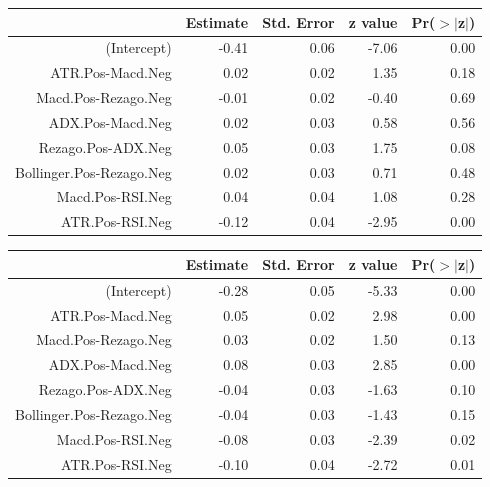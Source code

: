 \documentclass[a4paper,12pt]{Latex/Classes/PhDthesisPSnPDF}
\begin{document}
\begin{center}
\begin{table}[ht]
\centering
\begin{tabular}{rrrrr}
  \hline
 & Estimate & Std. Error & z value & Pr($>$$|$z$|$) \\ 
  \hline
(Intercept) & -0.41 & 0.06 & -7.06 & 0.00 \\ 
  ATR.Pos-Macd.Neg & 0.02 & 0.02 & 1.35 & 0.18 \\ 
  Macd.Pos-Rezago.Neg & -0.01 & 0.02 & -0.40 & 0.69 \\ 
  ADX.Pos-Macd.Neg & 0.02 & 0.03 & 0.58 & 0.56 \\ 
  Rezago.Pos-ADX.Neg & 0.05 & 0.03 & 1.75 & 0.08 \\ 
  Bollinger.Pos-Rezago.Neg & 0.02 & 0.03 & 0.71 & 0.48 \\ 
  Macd.Pos-RSI.Neg & 0.04 & 0.04 & 1.08 & 0.28 \\ 
  ATR.Pos-RSI.Neg & -0.12 & 0.04 & -2.95 & 0.00 \\ 
   \hline
\end{tabular}
\end{table}\end{center}

\newpage
\begin{center}
\begin{table}[ht]
\centering
\begin{tabular}{rrrrr}
  \hline
 & Estimate & Std. Error & z value & Pr($>$$|$z$|$) \\ 
  \hline
(Intercept) & -0.28 & 0.05 & -5.33 & 0.00 \\ 
  ATR.Pos-Macd.Neg & 0.05 & 0.02 & 2.98 & 0.00 \\ 
  Macd.Pos-Rezago.Neg & 0.03 & 0.02 & 1.50 & 0.13 \\ 
  ADX.Pos-Macd.Neg & 0.08 & 0.03 & 2.85 & 0.00 \\ 
  Rezago.Pos-ADX.Neg & -0.04 & 0.03 & -1.63 & 0.10 \\ 
  Bollinger.Pos-Rezago.Neg & -0.04 & 0.03 & -1.43 & 0.15 \\ 
  Macd.Pos-RSI.Neg & -0.08 & 0.03 & -2.39 & 0.02 \\ 
  ATR.Pos-RSI.Neg & -0.10 & 0.04 & -2.72 & 0.01 \\ 
   \hline
\end{tabular}
\end{table}\end{center}
\end{document}
